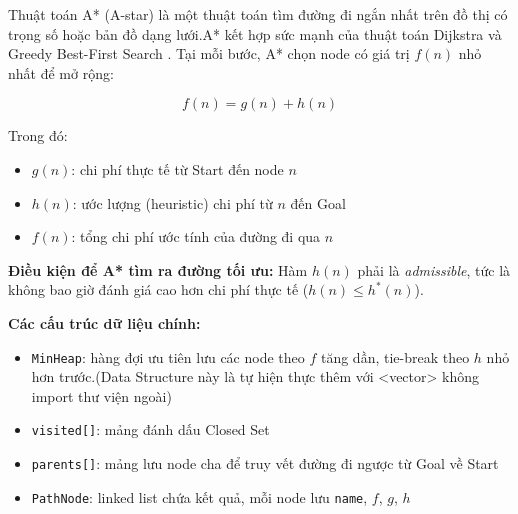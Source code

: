 \documentclass[13pt,a4paper]{article}
\begin{document}
Thuật toán A* (A-star) là một thuật toán tìm đường đi ngắn nhất trên đồ thị có trọng số hoặc bản đồ dạng lưới.A* kết hợp sức mạnh của thuật toán Dijkstra và Greedy Best-First Search . Tại mỗi bước, A* chọn node có giá trị $f(n)$ nhỏ nhất để mở rộng:

\[  
    f(n) = g(n) + h(n)
\]

Trong đó:
\begin{itemize}
    \item $g(n)$: chi phí thực tế từ Start đến node $n$
    \item $h(n)$: ước lượng (heuristic) chi phí từ $n$ đến Goal
    \item $f(n)$: tổng chi phí ước tính của đường đi qua $n$
\end{itemize}

\textbf{Điều kiện để A* tìm ra đường tối ưu:} Hàm $h(n)$ phải là \textit{admissible}, tức là không bao giờ đánh giá cao hơn chi phí thực tế ($h(n) \leq h^*(n)$).

\textbf{Các cấu trúc dữ liệu chính:}
\begin{itemize}
    \item \texttt{MinHeap}: hàng đợi ưu tiên lưu các node theo $f$ tăng dần, tie-break theo $h$ nhỏ hơn trước.(Data Structure này là tự hiện thực thêm với <vector> không import thư viện ngoài)
    \item \texttt{visited[]}: mảng đánh dấu Closed Set
    \item \texttt{parents[]}: mảng lưu node cha để truy vết đường đi ngược từ Goal về Start
    \item \texttt{PathNode}: linked list chứa kết quả, mỗi node lưu \texttt{name}, $f$, $g$, $h$
\end{itemize}
\end{document}

